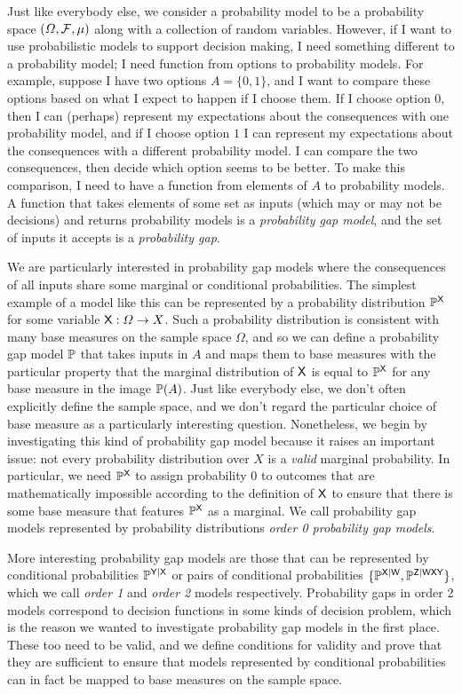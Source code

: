 Just like everybody else, we consider a probability model to be a probability space $(\Omega,\mathcal{F},\mu)$ along with a collection of random variables. However, if I want to use probabilistic models to support decision making, I need something different to a probability model; I need function from options to probability models. For example, suppose I have two options $A=\{0,1\}$, and I want to compare these options based on what I expect to happen if I choose them. If I choose option $0$, then I can (perhaps) represent my expectations about the consequences with one probability model, and if I choose option $1$ I can represent my expectations about the consequences with a different probability model. I can compare the two consequences, then decide which option seems to be better. To make this comparison, I need to have a function from elements of $A$ to probability models. A function that takes elements of some set as inputs (which may or may not be decisions) and returns probability models is a \emph{probability gap model}, and the set of inputs it accepts is a \emph{probability gap}.

We are particularly interested in probability gap models where the consequences of all inputs share some marginal or conditional probabilities. The simplest example of a model like this can be represented by a probability distribution $\mathbb{P}^{\mathsf{X}}$ for some variable $\mathsf{X}:\Omega\to X$. Such a probability distribution is consistent with many base measures on the sample space $\Omega$, and so we can define a probability gap model $\mathbb{P}$ that takes inputs in $A$ and maps them to base measures with the particular property that the marginal distribution of $\mathsf{X}$ is equal to $\mathbb{P}^{\mathsf{X}}$ for any base measure in the image $\mathbb{P}(A)$. Just like everybody else, we don't often explicitly define the sample space, and we don't regard the particular choice of base measure as a particularly interesting question. Nonetheless, we begin by investigating this kind of probability gap model because it raises an important issue: not every probability distribution over $X$ is a \emph{valid} marginal probability. In particular, we need $\mathbb{P}^{\mathsf{X}}$ to assign probability 0 to outcomes that are mathematically impossible according to the definition of $\mathsf{X}$ to ensure that there is some base measure that features $\mathbb{P}^{\mathsf{X}}$ as a marginal. We call probability gap models represented by probability distributions \emph{order 0 probability gap models}.

More interesting probability gap models are those that can be represented by conditional probabilities $\mathbb{P}^{\mathsf{Y}|\mathsf{X}}$ or pairs of conditional probabilities $\{\mathbb{P}^{\mathsf{X}|\mathsf{W}},\mathbb{P}^{\mathsf{Z}|\mathsf{WXY}}\}$, which we call \emph{order 1} and \emph{order 2} models respectively. Probability gaps in order 2 models correspond to decision functions in some kinds of decision problem, which is the reason we wanted to investigate probability gap models in the first place. These too need to be valid, and we define conditions for validity and prove that they are sufficient to ensure that models represented by conditional probabilities can in fact be mapped to base measures on the sample space.

